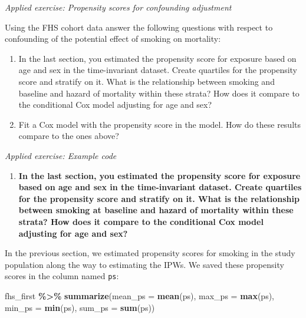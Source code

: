 \documentclass[
]{book}
\newenvironment{Shaded}{\begin{snugshade}}{\end{snugshade}}
\newcommand{\AttributeTok}[1]{\textcolor[rgb]{0.13,0.29,0.53}{#1}}
\newcommand{\FunctionTok}[1]{\textcolor[rgb]{0.13,0.29,0.53}{\textbf{#1}}}
\newcommand{\NormalTok}[1]{#1}
\newcommand{\SpecialCharTok}[1]{\textcolor[rgb]{0.81,0.36,0.00}{\textbf{#1}}}
\providecommand{\tightlist}{%
  \setlength{\itemsep}{0pt}\setlength{\parskip}{0pt}}
\begin{document}
\emph{Applied exercise: Propensity scores for confounding adjustment}

Using the FHS cohort data answer the following questions with respect to confounding of the potential effect of smoking on mortality:

\begin{enumerate}
\def\labelenumi{\arabic{enumi}.}
\tightlist
\item
  In the last section, you estimated the propensity score for exposure based on age and sex in the time-invariant dataset. Create quartiles for the propensity score and stratify on it. What is the relationship between smoking and baseline and hazard of mortality within these strata? How does it compare to the conditional Cox model adjusting for age and sex?
\item
  Fit a Cox model with the propensity score in the model. How do these results compare to the ones above?
\end{enumerate}

\emph{Applied exercise: Example code}

\begin{enumerate}
\def\labelenumi{\arabic{enumi}.}
\tightlist
\item
  \textbf{In the last section, you estimated the propensity score for exposure based on age and sex in the time-invariant dataset. Create quartiles for the propensity score and stratify on it. What is the relationship between smoking at baseline and hazard of mortality within these strata? How does it compare to the conditional Cox model adjusting for age and sex?}
\end{enumerate}

In the previous section, we estimated propensity scores for smoking in the study population along the way to estimating the IPWs. We saved these propensity scores in the column named \texttt{ps}:

\begin{Shaded}
\begin{Highlighting}[]
\NormalTok{fhs\_first }\SpecialCharTok{\%\textgreater{}\%}
  \FunctionTok{summarize}\NormalTok{(}\AttributeTok{mean\_ps =} \FunctionTok{mean}\NormalTok{(ps),}
            \AttributeTok{max\_ps =} \FunctionTok{max}\NormalTok{(ps),}
            \AttributeTok{min\_ps =} \FunctionTok{min}\NormalTok{(ps),}
            \AttributeTok{sum\_ps =} \FunctionTok{sum}\NormalTok{(ps))}
\end{Highlighting}
\end{Shaded}
\end{document}
